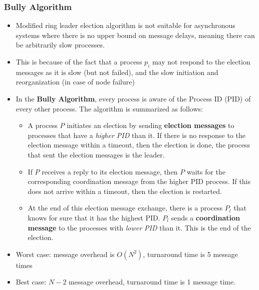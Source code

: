 \documentclass{article}
\begin{document}
\subsubsection{Bully Algorithm}
\begin{itemize}
    \item Modified ring leader election algorithm is not suitable for asynchronous systems where there is no upper bound on message delays, meaning there can be arbitrarily slow processes. 
    
    \item This is because of the fact that a process $p_i$ may not respond to the election messages as it is slow (but not failed), and the slow initiation and reorganization (in case of node failure)
    
    \item In the \textbf{Bully Algorithm}, every process is aware of the Process ID (PID) of every other process. The algorithm is summarized as follows:
    \begin{itemize}
        \item A process $P$ initiates an election by sending \textbf{election messages} to processes that have a \textit{higher PID} than it. If there is no response to the election message within a timeout, then the election is done, the process that sent the election messages is the leader.
        
        \item If $P$ receives a reply to its election message, then $P$ waits for the corresponding coordination message from the higher PID process. If this does not arrive within a timeout, then the election is restarted.
        
        \item At the end of this election message exchange, there is a process $P_l$ that knows for sure that it has the highest PID. $P_l$ sends a \textbf{coordination message} to the processes with \textit{lower PID} than it. This is the end of the election.
    \end{itemize}
    
    \item Worst case: message overhead is $O(N^2)$, turnaround time is 5 message times
    
    \item Best case: $N-2$ message overhead, turnaround time is 1 message time. 
\end{itemize}
\end{document}
